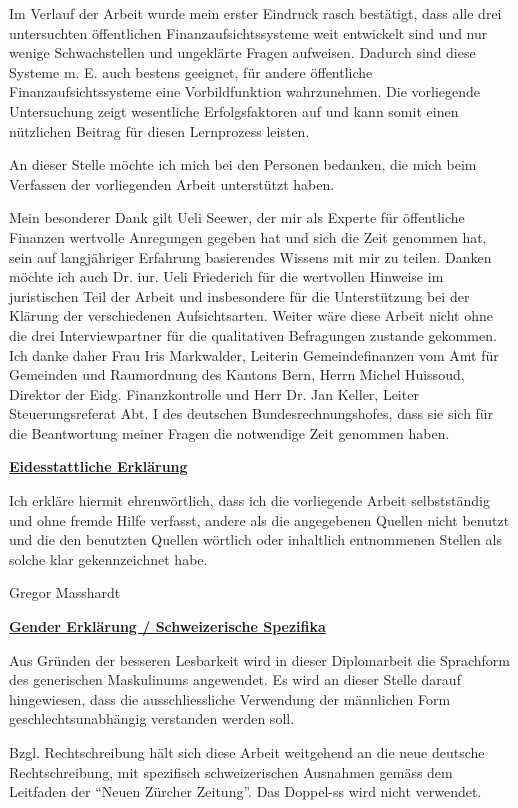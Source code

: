 \documentclass[10pt]{article}
\begin{document}
Im Verlauf der Arbeit wurde mein erster Eindruck rasch bestätigt, dass alle drei untersuchten öffentlichen Finanzaufsichtssysteme weit entwickelt sind und nur wenige Schwachstellen und ungeklärte Fragen aufweisen. Dadurch sind diese Systeme m. E. auch bestens geeignet, für andere öffentliche Finanzaufsichtssysteme eine Vorbildfunktion wahrzunehmen. Die vorliegende Untersuchung zeigt wesentliche Erfolgsfaktoren auf und kann somit einen nützlichen Beitrag für diesen Lernprozess leisten. 

An dieser Stelle möchte ich mich bei den Personen bedanken, die mich beim Verfassen der vorliegenden Arbeit unterstützt haben. 

Mein besonderer Dank gilt Ueli Seewer, der mir als Experte für öffentliche Finanzen wertvolle Anregungen gegeben hat und sich die Zeit genommen hat, sein auf langjähriger Erfahrung basierendes Wissens mit mir zu teilen. Danken möchte ich auch Dr. iur. Ueli Friederich für die wertvollen Hinweise im juristischen Teil der Arbeit und insbesondere für die Unterstützung bei der Klärung der verschiedenen Aufsichtsarten. Weiter wäre diese Arbeit nicht ohne die drei Interviewpartner für die qualitativen Befragungen zustande gekommen. Ich danke daher Frau Iris Markwalder, Leiterin Gemeindefinanzen vom Amt für Gemeinden und Raumordnung des Kantons Bern, Herrn Michel Huissoud, Direktor der Eidg. Finanzkontrolle und Herr Dr. Jan Keller, Leiter Steuerungsreferat Abt. I des deutschen Bundesrechnungshofes, dass sie sich für die Beantwortung meiner Fragen die notwendige Zeit genommen haben.

\newpage
\underline{\textbf{Eidesstattliche Erklärung}}

Ich erkläre hiermit ehrenwörtlich, dass ich die vorliegende Arbeit selbstständig und ohne fremde Hilfe verfasst, andere als die angegebenen Quellen nicht benutzt und die den benutzten Quellen wörtlich oder inhaltlich entnommenen Stellen als solche klar gekennzeichnet habe.

\vspace{1.6cm}
Gregor Masshardt

\newpage
\underline{\textbf{Gender Erklärung / Schweizerische Spezifika}}

Aus Gründen der besseren Lesbarkeit wird in dieser Diplomarbeit die Sprachform des generischen Maskulinums angewendet. Es wird an dieser Stelle darauf hingewiesen, dass die ausschliessliche Verwendung der männlichen Form geschlechtsunabhängig verstanden werden soll.

Bzgl. Rechtschreibung hält sich diese Arbeit weitgehend an die neue deutsche Rechtschreibung, mit spezifisch schweizerischen Ausnahmen gemäss dem Leitfaden der “{}Neuen Zürcher Zeitung”{}. Das Doppel-ss wird nicht verwendet.
\end{document}

